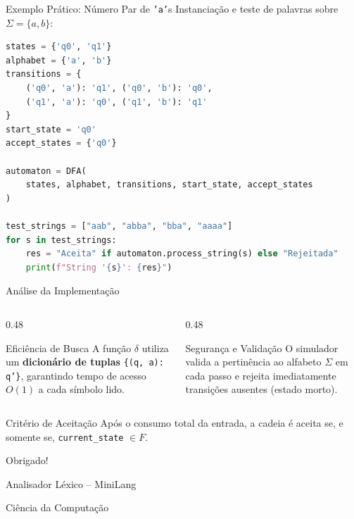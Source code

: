 \documentclass[aspectratio=169, 11pt]{beamer}
\begin{document}
\begin{frame}[fragile]{Exemplo Prático: Número Par de \texttt{'a'}s}
    Instanciação e teste de palavras sobre $\Sigma = \{a, b\}$:
    \begin{lstlisting}[language=Python, basicstyle=\ttfamily\tiny]
states = {'q0', 'q1'}
alphabet = {'a', 'b'}
transitions = {
    ('q0', 'a'): 'q1', ('q0', 'b'): 'q0',
    ('q1', 'a'): 'q0', ('q1', 'b'): 'q1'
}
start_state = 'q0'
accept_states = {'q0'}

automaton = DFA(
    states, alphabet, transitions, start_state, accept_states
)

test_strings = ["aab", "abba", "bba", "aaaa"]
for s in test_strings:
    res = "Aceita" if automaton.process_string(s) else "Rejeitada"
    print(f"String '{s}': {res}")
    \end{lstlisting}
\end{frame}

\begin{frame}{Análise da Implementação}
    \begin{columns}[T]
        \begin{column}{0.48\textwidth}
            \begin{block}{Eficiência de Busca}
                A função $\delta$ utiliza um \textbf{dicionário de tuplas} \texttt{\{(q, a): q'\}}, garantindo tempo de acesso $O(1)$ a cada símbolo lido.
            \end{block}
        \end{column}
        
        \begin{column}{0.48\textwidth}
            \begin{block}{Segurança e Validação}
                O simulador valida a pertinência ao alfabeto $\Sigma$ em cada passo e rejeita imediatamente transições ausentes (estado morto).
            \end{block}
        \end{column}
    \end{columns}
    
    \vspace{0.5cm}
    \begin{alertblock}{Critério de Aceitação}
        Após o consumo total da entrada, a cadeia é aceita se, e somente se, \texttt{current\_state} $\in F$.
    \end{alertblock}
\end{frame}


\begin{frame}
    \centering

    {\Huge\color{primary} Obrigado!}

    \vspace{0.5cm}

    {\large Analisador Léxico -- MiniLang}

    \vspace{0.3cm}

    {\small Ciência da Computação}
\end{frame}
\end{document}
